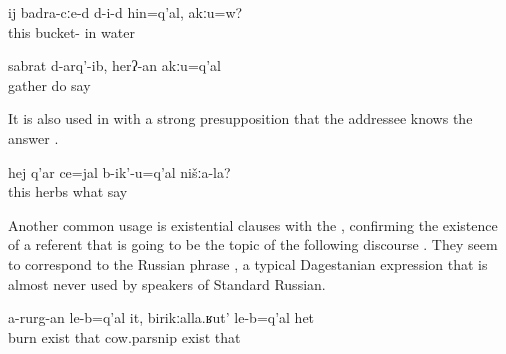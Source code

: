 \begin{exe}
	\ex	\label{ex:In this bucket is water, right minor}
	\gll	ij	badra-cːe-d	d-i-d	hin=q'al,	akːu=w?\\
		this	bucket-	in	water	\\
	\glt	{}

	\ex	\label{ex:Gather did, (we/you) don't say so minor}
	\gll	sabrat		d-arq'-ib,	herʔ-an	akːu=q'al\\
		gather	do	say	\\
	\glt	{}
\end{exe}

It is also used in  with a strong presupposition that the addressee knows the answer .

\begin{exe}
	\ex	\label{ex:‎These herbs here, how are they called in our (language) minor}
	\gll	hej	q'ar	ce=jal	b-ik'-u=q'al	nišːa-la?\\
		this	herbs	what	say	\\
	\glt	{}
\end{exe}

Another common usage is existential clauses with the  , confirming the existence of a referent that is going to be the topic of the following discourse . They seem to correspond to the Russian phrase , a typical Dagestanian expression that is almost never used by speakers of Standard Russian.

\begin{exe}
	\ex	\label{ex:There is the one that does not burn, the cow-parsnip minor}
	\gll	a-rurg-an	le-b=q'al	it,	birikːalla.ʁut'	le-b=q'al	het\\
		burn	exist	that	cow.parsnip	exist	that\\
	\glt	{}
\end{exe}


